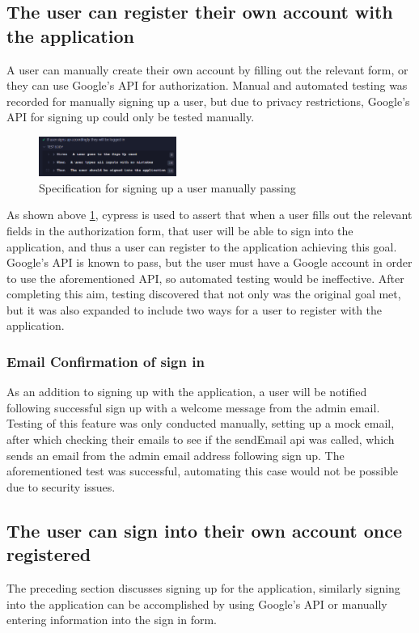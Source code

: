 \subsection{The user can register their own account with the application}
A user can manually create their own account by filling out the relevant form, or they can use Google's API for authorization. Manual and automated testing was recorded for manually signing up a user, but due to privacy restrictions, Google's API for signing up could only be tested manually.

\begin{figure}[h!]
    \centering
    \includegraphics[width=0.4\textwidth]{images/TestPassSignUp.png}
    \caption{Specification for signing up a user manually passing}
    \label{image:TestPassSignUp}
\end{figure}

As shown above \ref{image:TestPassSignUp}, cypress is used to assert that when a user fills out the relevant fields in the authorization form, that user will be able to sign into the application, and thus a user can register to the application achieving this goal. Google's API is known to pass, but the user must have a Google account in order to use the aforementioned API, so automated testing would be ineffective. After completing this aim, testing discovered that not only was the original goal met, but it was also expanded to include two ways for a user to register with the application.

\subsubsection{Email Confirmation of sign in}
As an addition to signing up with the application, a user will be notified following successful sign up with a welcome message from the admin email. Testing of this feature was only conducted manually, setting up a mock email, after which checking their emails to see if the sendEmail api was called, which sends an email from the admin email address following sign up. The aforementioned test was successful, automating this case would not be possible due to security issues.

\subsection{The user can sign into their own account once registered}
The preceding section discusses signing up for the application, similarly signing into the application can be accomplished by using Google's API or manually entering information into the sign in form.

